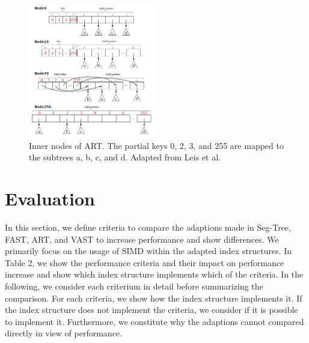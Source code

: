 \documentclass[runningheads,a4paper]{llncs}
\begin{document}
\begin{figure}
	\includegraphics[width=0.5\textwidth]{figure_4.png}
	\caption{Inner nodes of ART. The partial keys 0, 2, 3, and 255 are mapped to the subtrees a, b, c, and d. Adapted from Leis et al. \cite{leis2013adaptive}}
	\label{fig}
\end{figure}


\section{Evaluation}
In this section, we define criteria to compare the adaptions made in Seg-Tree, FAST, ART, and VAST to increase performance and show differences. We primarily focus on the usage of SIMD within the adapted index structures. %
In Table 2, we show the performance criteria and their impact on performance increase and show which index structure implements which of the criteria. In the following, we consider each criterium in detail before summarizing the comparison. For each criteria, we show how the index structure implements it. If the index structure does not implement the criteria, we consider if it is possible to implement it. Furthermore, we constitute why the adaptions cannot compared directly in view of performance.
\end{document}
